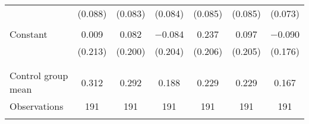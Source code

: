 \begin{tabular}{@{\extracolsep{5pt}}lcccccc}
  & (0.088) & (0.083) & (0.084) & (0.085) & (0.085) & (0.073) \\ 
  & & & & & & \\ 
 Constant & 0.009 & 0.082 & $-$0.084 & 0.237 & 0.097 & $-$0.090 \\ 
  & (0.213) & (0.200) & (0.204) & (0.206) & (0.205) & (0.176) \\ 
  & & & & & & \\ 
\hline \\[-1.8ex] 
Control group mean & 0.312 & 0.292 & 0.188 & 0.229 & 0.229 & 0.167 \\ 
Observations & 191 & 191 & 191 & 191 & 191 & 191 \\ 
\hline 
\hline \\[-1.8ex] 
\end{tabular} 
